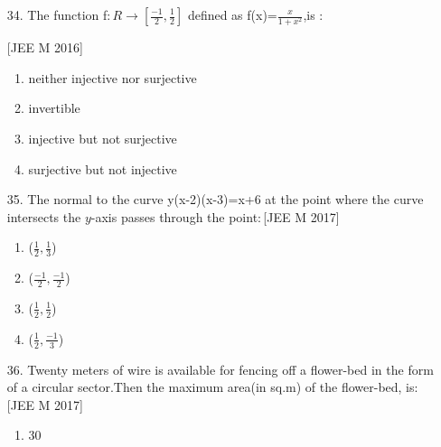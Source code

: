 \documentclass[journal,12pt,twocolumn]{IEEEtran}
\theoremstyle{remark}
\begin{document}
\begin{enumerate}
\hfill[JEE M 2016]\\
\begin{enumerate}
    \item  x=2r\\
    \item  2x=r\\
    \item  2x=$(\pi+4)r$\\
    \item (4$-\pi)x=\pi$r\\
\end{enumerate}
\item[34.]The function f$: R\rightarrow{[\frac{-1}{2},\frac{1}{2}]}$ defined as f(x)=$\frac{x}{1+x^2}$,is $:$

\hfill[JEE M 2016]\\
\begin{enumerate}
    \item  neither injective nor surjective\\
    \item  invertible\\
    \item  injective but not surjective\\
    \item  surjective but not injective\\
\end{enumerate}
\item[35.] The normal to the curve y(x-2)(x-3)=x+6 at the point where the curve intersects the $y$-axis passes through the point$:$\hfill[JEE M 2017]
\begin{enumerate}
    \item  ($\frac{1}{2},\frac{1}{3}$)\\
    \item  ($\frac{-1}{2},\frac{-1}{2}$)\\
    \item  ($\frac{1}{2},\frac{1}{2}$)\\
    \item  ($\frac{1}{2},\frac{-1}{3}$)\\
\end{enumerate}
\item[36.] Twenty meters of wire is available for fencing off a flower-bed in the form of a circular sector.Then the maximum area(in sq.m) of the flower-bed, is$:$\hfill[JEE M 2017]\\
\begin{enumerate}
    \item  30\\

\end{enumerate}
\end{enumerate}
\end{document}
